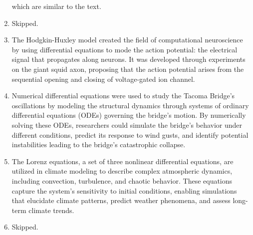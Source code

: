 \documentclass[11pt]{article}
\begin{document}
\begin{enumerate}
    which are similar to the text.

    \item Skipped.
    
    \item The Hodgkin-Huxley model created the field of computational neuroscience by using differential equations to mode the action potential: the electrical signal that propagates along neurons. It was developed through experiments on the giant squid axon, proposing that the action potential arises from the sequential opening and closing of voltage-gated ion channel. 
    
    \item Numerical differential equations were used to study the Tacoma Bridge's oscillations by modeling the structural dynamics through systems of ordinary differential equations (ODEs) governing the bridge's motion. By numerically solving these ODEs, researchers could simulate the bridge's behavior under different conditions, predict its response to wind gusts, and identify potential instabilities leading to the bridge's catastrophic collapse.
    
    \item The Lorenz equations, a set of three nonlinear differential equations, are utilized in climate modeling to describe complex atmospheric dynamics, including convection, turbulence, and chaotic behavior. These equations capture the system's sensitivity to initial conditions, enabling simulations that elucidate climate patterns, predict weather phenomena, and assess long-term climate trends.
    
    \item Skipped.
    
\end{enumerate}
\end{document}
